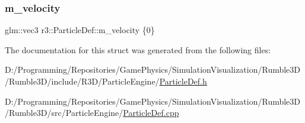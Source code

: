 \mbox{\label{structr3_1_1_particle_def_a0c69fb8b0e2994e5ff24aa1156bdb5fd}} 
\subsubsection{\texorpdfstring{m\+\_\+velocity}{m\_velocity}}
{\footnotesize\ttfamily glm\+::vec3 r3\+::\+Particle\+Def\+::m\+\_\+velocity \{0\}}



The documentation for this struct was generated from the following files\+:\begin{DoxyCompactItemize}
\item 
D\+:/\+Programming/\+Repositories/\+Game\+Physics/\+Simulation\+Visualization/\+Rumble3\+D/\+Rumble3\+D/include/\+R3\+D/\+Particle\+Engine/\mbox{\hyperlink{_particle_def_8h}{Particle\+Def.\+h}}\item 
D\+:/\+Programming/\+Repositories/\+Game\+Physics/\+Simulation\+Visualization/\+Rumble3\+D/\+Rumble3\+D/src/\+Particle\+Engine/\mbox{\hyperlink{_particle_def_8cpp}{Particle\+Def.\+cpp}}\end{DoxyCompactItemize}
